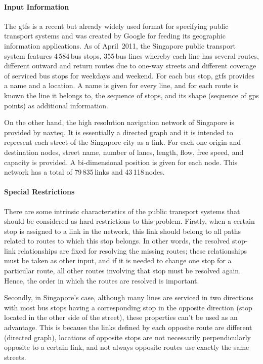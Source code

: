 \paragraph{Input Information}

The \gls{gtfs} is a recent but already widely used format for specifying public transport systems and was created by Google for feeding its geographic information applications. As of April~2011, the Singapore public transport system features 4\,584\,bus stops, 355\,bus lines whereby each line has several routes, \eg different outward and return routes due to one-way streets and different coverage of serviced bus stops for weekdays and weekend. For each bus stop, \gls{gtfs} provides a name and a location. A name is given for every line, and for each route is known the line it belongs to, the sequence of stops, and its shape (sequence of \gls{gps} points) as additional information.

On the other hand, the high resolution navigation network of Singapore is provided by \gls{navteq}. It is essentially a directed graph and it is intended to represent each street of the Singapore city as a link. For each one origin and destination nodes, street name, number of lanes, length, flow, free speed, and capacity is provided. A bi-dimensional position is given for each node. This network has a total of 79\,835\,links and 43\,118\,nodes.

\paragraph{Special Restrictions}

There are some intrinsic characteristics of the public transport systems that should be considered as hard restrictions to this problem. Firstly, when a certain stop is assigned to a link in the network, this link should belong to all paths related to routes to which this stop belongs. In other words, the resolved stop-link relationships are fixed for resolving the missing routes; these relationships must be taken as other input, and if it is needed to change one stop for a particular route, all other routes involving that stop must be resolved again. Hence, the order in which the routes are resolved is important.

Secondly, in Singapore's case, although many lines are serviced in two directions with most bus stops having a corresponding stop in the opposite direction (stop located in the other side of the street), these properties can't be used as an advantage. This is because the links defined by each opposite route are different (directed graph), locations of opposite stops are not necessarily perpendicularly opposite to a certain link, and not always opposite routes use exactly the same streets.

